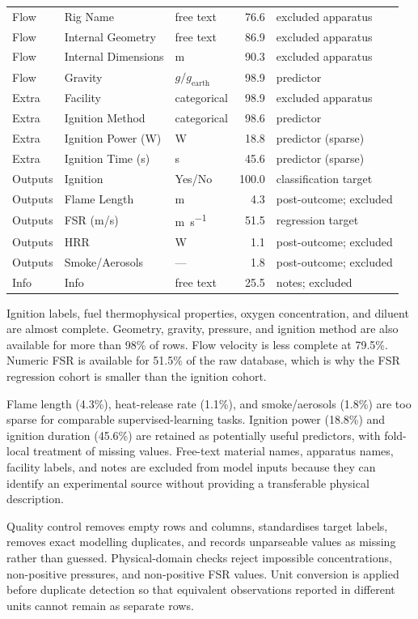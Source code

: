 {\begin{longtable}{@{}p{}p{}p{}r p{}@{}}
Flow & Rig Name & free text & 76.6 & excluded apparatus \\
Flow & Internal Geometry & free text & 86.9 & excluded apparatus \\
Flow & Internal Dimensions & m & 90.3 & excluded apparatus \\
Flow & Gravity & \(g/g_{\mathrm{earth}}\) & 98.9 & predictor \\
Extra & Facility & categorical & 98.9 & excluded apparatus \\
Extra & Ignition Method & categorical & 98.6 & predictor \\
Extra & Ignition Power (W) & W & 18.8 & predictor (sparse) \\
Extra & Ignition Time (s) & s & 45.6 & predictor (sparse) \\
Outputs & Ignition & Yes/No & 100.0 & classification target \\
Outputs & Flame Length & m & 4.3 & post-outcome; excluded \\
Outputs & FSR (m/s) & \si{\metre\per\second} & 51.5 & regression target \\
Outputs & HRR & W & 1.1 & post-outcome; excluded \\
Outputs & Smoke/Aerosols & --- & 1.8 & post-outcome; excluded \\
Info & Info & free text & 25.5 & notes; excluded \\
\end{longtable}
}

Ignition labels, fuel thermophysical properties, oxygen concentration, and
diluent are almost complete. Geometry, gravity, pressure, and ignition method
are also available for more than 98\% of rows. Flow velocity is less complete
at 79.5\%. Numeric FSR is available for 51.5\% of the raw database, which is
why the FSR regression cohort is smaller than the ignition cohort.

Flame length (4.3\%), heat-release rate (1.1\%), and smoke/aerosols (1.8\%)
are too sparse for comparable supervised-learning tasks. Ignition power
(18.8\%) and ignition duration (45.6\%) are retained as potentially useful
predictors, with fold-local treatment of missing values. Free-text material
names, apparatus names, facility labels, and notes are excluded from model
inputs because they can identify an experimental source without providing a
transferable physical description.

Quality control removes empty rows and columns, standardises target labels,
removes exact modelling duplicates, and records unparseable values as missing
rather than guessed. Physical-domain checks reject impossible concentrations,
non-positive pressures, and non-positive FSR values. Unit conversion is applied
before duplicate detection so that equivalent observations reported in different
units cannot remain as separate rows.

